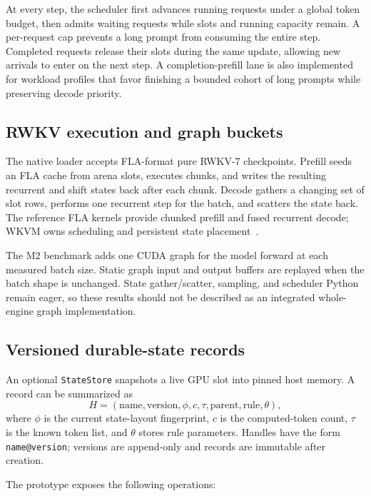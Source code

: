 \documentclass[10pt,letterpaper]{article}
\newcommand{\code}[1]{\texttt{#1}}
\newcommand{\wkvm}{\textsc{WKVM}}
\begin{document}
At every step, the scheduler first advances running requests under a global
token budget, then admits waiting requests while slots and running capacity
remain.  A per-request cap prevents a long prompt from consuming the entire
step.  Completed requests release their slots during the same update, allowing
new arrivals to enter on the next step.  A completion-prefill lane is also
implemented for workload profiles that favor finishing a bounded cohort of
long prompts while preserving decode priority.

\subsection{RWKV execution and graph buckets}

The native loader accepts FLA-format pure RWKV-7 checkpoints.  Prefill seeds an
FLA cache from arena slots, executes chunks, and writes the resulting recurrent
and shift states back after each chunk.  Decode gathers a changing set of slot
rows, performs one recurrent step for the batch, and scatters the state back.
The reference FLA kernels provide chunked prefill and fused recurrent decode;
\wkvm{} owns scheduling and persistent state placement~\cite{fla}.

The M2 benchmark adds one CUDA graph for the model forward at each measured
batch size.  Static graph input and output buffers are replayed when the batch
shape is unchanged.  State gather/scatter, sampling, and scheduler Python
remain eager, so these results should not be described as an integrated
whole-engine graph implementation.

\subsection{Versioned durable-state records}

An optional \code{StateStore} snapshots a live GPU slot into pinned host
memory.  A record can be summarized as
\begin{equation}
  H = (\text{name},\text{version},\phi,c,\tau,
       \text{parent},\text{rule},\theta),
  \label{eq:handle}
\end{equation}
where $\phi$ is the current state-layout fingerprint, $c$ is the computed-token
count, $\tau$ is the known token list, and $\theta$ stores rule parameters.
Handles have the form \code{name@version}; versions are append-only and records
are immutable after creation.

The prototype exposes the following operations:
\end{document}
